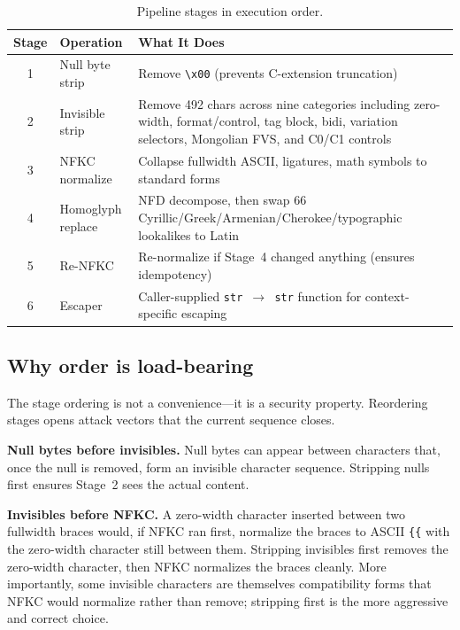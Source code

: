 \documentclass[11pt,letterpaper]{article}
\begin{document}
\begin{table}[h]
\centering
\small
\begin{tabularx}{\textwidth}{c l X}
\toprule
\textbf{Stage} & \textbf{Operation} & \textbf{What It Does} \\
\midrule
1 & Null byte strip & Remove \texttt{\textbackslash x00} (prevents C-extension truncation) \\
2 & Invisible strip & Remove 492 chars across nine categories including zero-width, format/control, tag block, bidi, variation selectors, Mongolian FVS, and C0/C1 controls \\
3 & NFKC normalize & Collapse fullwidth ASCII, ligatures, math symbols to standard forms \\
4 & Homoglyph replace & NFD decompose, then swap 66 Cyrillic/Greek/Armenian/Cherokee/typographic lookalikes to Latin \\
5 & Re-NFKC & Re-normalize if Stage~4 changed anything (ensures idempotency) \\
6 & Escaper & Caller-supplied \texttt{str~$\rightarrow$~str} function for context-specific escaping \\
\bottomrule
\end{tabularx}
\caption{Pipeline stages in execution order.}
\end{table}

\subsection{Why order is load-bearing}

The stage ordering is not a convenience---it is a security property. Reordering stages opens attack vectors that the current sequence closes.

\textbf{Null bytes before invisibles.} Null bytes can appear between characters that, once the null is removed, form an invisible character sequence. Stripping nulls first ensures Stage~2 sees the actual content.

\textbf{Invisibles before NFKC.} A zero-width character inserted between two fullwidth braces would, if NFKC ran first, normalize the braces to ASCII \texttt{\{\{} with the zero-width character still between them. Stripping invisibles first removes the zero-width character, then NFKC normalizes the braces cleanly. More importantly, some invisible characters are themselves compatibility forms that NFKC would normalize rather than remove; stripping first is the more aggressive and correct choice.
\end{document}
